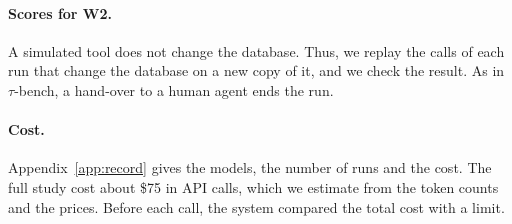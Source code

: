 \paragraph{Scores for W2.}
A simulated tool does not change the database. Thus, we replay the calls of each run that change
the database on a new copy of it, and we check the result. As in $\tau$-bench, a hand-over to a
human agent ends the run.

\paragraph{Cost.}
Appendix~\ref{app:record} gives the models, the number of runs and the cost. The full study cost
about \$75 in API calls, which we estimate from the token counts and the prices. Before each
call, the system compared the total cost with a limit.
